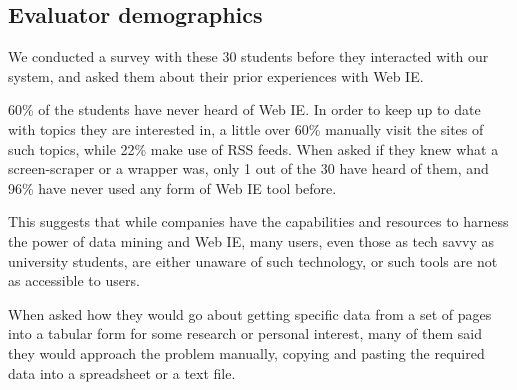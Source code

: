 \subsection{Evaluator demographics}
We conducted a survey with these 30 students before they interacted with our system,
and asked them about their prior experiences with Web IE.

60\% of the students have never heard of Web IE. In order to keep up
to date with topics they are interested in, a little over 60\% manually visit the
sites of such topics, while 22\% make use of RSS feeds. When asked if they knew 
what a screen-scraper or a wrapper was, only 1 out of the 30 have heard of them,
and 96\% have never used any form of Web IE tool before.

This suggests that while companies have the capabilities and resources to harness
the power of data mining and Web IE, many users, even those as tech savvy as 
university students, are either unaware of such technology, or such tools are
not as accessible to users.

When asked how they would go about getting specific data from a set of pages 
into a tabular form for some research or personal interest, many of them said
they would approach the problem manually, copying and pasting the required data
into a spreadsheet or a text file.
